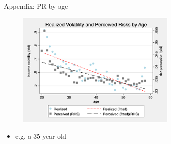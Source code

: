\documentclass{beamer}
\begin{document}
\begin{frame}{Appendix: PR by age}
	\begin{figure}[ht]
		\label{appendix:age_compare_figure}
		\centering
		\includegraphics[width=0.7\textwidth]{figures/real_log_wage_shk_gr_by_age_compare.png}
	\end{figure}
	\begin{itemize}
		\item e.g. a 35-year old   \quad  \hyperlink{age_compare}{} 
	\end{itemize}
\end{frame}
\end{document}
